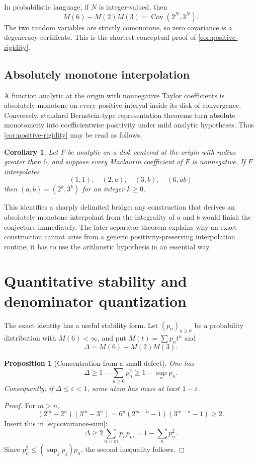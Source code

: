 \documentclass[11pt]{article}
\newtheorem{proposition}[theorem]{Proposition}
\newtheorem{corollary}[theorem]{Corollary}
\theoremstyle{definition}
\newcommand{\Cov}{\operatorname{Cov}}
\begin{document}
In probabilistic language, if $N$ is integer-valued, then
\[
 M(6)-M(2)M(3)=\Cov(2^N,3^N).
\]
The two random variables are strictly comonotone, so zero covariance is a degeneracy certificate.  This is the shortest conceptual proof of \cref{cor:positive-rigidity}.

\subsection{Absolutely monotone interpolation}

A function analytic at the origin with nonnegative Taylor coefficients is absolutely monotone on every positive interval inside its disk of convergence.  Conversely, standard Bernstein-type representation theorems turn absolute monotonicity into coefficientwise positivity under mild analytic hypotheses.  Thus \cref{cor:positive-rigidity} may be read as follows.

\begin{corollary}\label{cor:absolute-monotone}
Let $F$ be analytic on a disk centered at the origin with radius greater than $6$, and
suppose every Maclaurin coefficient of $F$ is nonnegative.  If $F$ interpolates
\[
 (1,1),\quad (2,a),\quad (3,b),\quad (6,ab)
\]
then $(a,b)=(2^k,3^k)$ for an integer $k\ge0$.
\end{corollary}

This identifies a sharply delimited bridge: any construction that derives an absolutely monotone interpolant from the integrality of $a$ and $b$ would finish the conjecture immediately.  The later separator theorem explains why an exact construction cannot arise from a generic positivity-preserving interpolation routine; it has to use the arithmetic hypothesis in an essential way.

\section{Quantitative stability and denominator quantization}\label{sec:stability}

The exact identity has a useful stability form.  Let $(p_n)_{n\ge0}$ be a probability
distribution with $M(6)<\infty$, and put $M(t)=\sum p_nt^n$ and
\[
 \Delta=M(6)-M(2)M(3).
\]

\begin{proposition}[Concentration from a small defect]\label{prop:stability}
One has
\begin{equation}\label{eq:stability}
 \Delta\ge 1-\sum_{n\ge0}p_n^2\ge 1-\sup_n p_n.
\end{equation}
Consequently, if $\Delta\le\varepsilon<1$, some atom has mass at least $1-\varepsilon$.
\end{proposition}
\begin{proof}
For $m>n$,
\[
 (2^m-2^n)(3^m-3^n)
 =6^n(2^{m-n}-1)(3^{m-n}-1)\ge2.
\]
Insert this in \eqref{eq:covariance-sum}:
\[
 \Delta\ge2\sum_{n<m}p_np_m=1-\sum_np_n^2.
\]
Since $p_n^2\le(\sup_jp_j)p_n$, the second inequality follows.
\end{proof}
\end{document}
